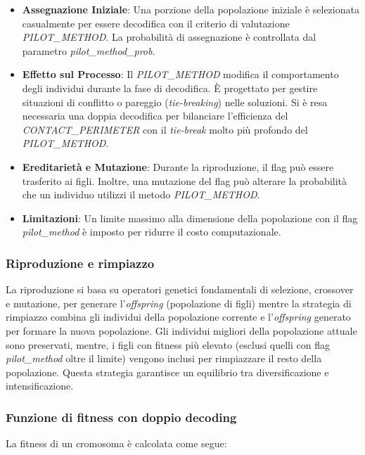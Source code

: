 \begin{itemize}
    \item \textbf{Assegnazione Iniziale}: Una porzione della popolazione iniziale è selezionata casualmente per essere decodifica con il criterio di valutazione \emph{PILOT\_METHOD}. La probabilità di assegnazione è controllata dal parametro \emph{pilot\_method\_prob}.
    \item \textbf{Effetto sul Processo}: Il \emph{PILOT\_METHOD} modifica il comportamento degli individui durante la fase di decodifica. È progettato per gestire situazioni di conflitto o pareggio (\emph{tie-breaking}) nelle soluzioni. Si è resa necessaria una doppia decodifica per bilanciare l'efficienza del \emph{CONTACT\_PERIMETER} con il \emph{tie-break} molto più profondo del \emph{PILOT\_METHOD}.
    \item \textbf{Ereditarietà e Mutazione}: Durante la riproduzione, il flag può essere trasferito ai figli. Inoltre, una mutazione del flag può alterare la probabilità che un individuo utilizzi il metodo \emph{PILOT\_METHOD}.
    \item \textbf{Limitazioni}: Un limite massimo alla dimensione della popolazione con il flag \emph{pilot\_method} è imposto per ridurre il costo computazionale.
\end{itemize}

\subsubsection*{Riproduzione e rimpiazzo}

La riproduzione si basa su operatori genetici fondamentali di selezione, crossover e mutazione, per generare l'\emph{offspring} (popolazione di figli) mentre la strategia di rimpiazzo combina gli individui della popolazione corrente e l'\emph{offspring} generato per formare la nuova popolazione. Gli individui migliori della popolazione attuale sono preservati, mentre, i figli con fitness più elevato (esclusi quelli con flag \emph{pilot\_method} oltre il limite) vengono inclusi per rimpiazzare il resto della popolazione. Questa strategia garantisce un equilibrio tra diversificazione e intensificazione.

\subsubsection*{Funzione di fitness con doppio decoding}

La fitness di un cromosoma è calcolata come segue:

